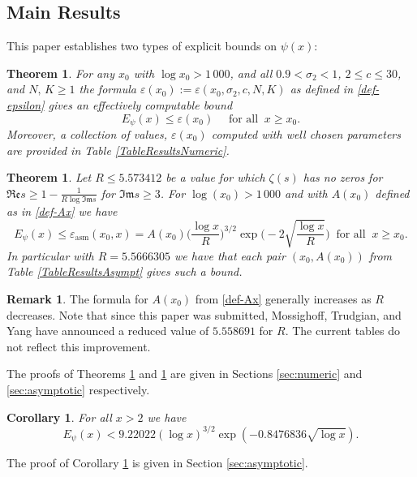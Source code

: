 \documentclass[10pt]{amsart}
\newtheorem{thm}[prop]{Theorem}
\newtheorem{cor}[prop]{Corollary}
\theoremstyle{definition}
\newtheorem{Rem}[prop]{Remark}
\numberwithin{equation}{section}
\begin{document}
\subsection{Main Results}


This paper establishes two types of explicit bounds on $\psi(x)$:

\begin{thm}\label{thm-numericVersion}
For any $x_0$ with $\log x_0>1\,000$,  and all $0.9 < \sigma_2 < 1$, $2 \le  c \le 30$,  and $N,\, K\ge 1$ the formula $\varepsilon(x_0)  := \varepsilon(x_0,\sigma_2,c,N,K)$ as defined in \eqref{def-epsilon} gives an effectively computable bound
\[ E_{\psi}(x)  \le  \varepsilon(x_0) \quad \text{ for all }\ x \ge x_0. \]
Moreover, a collection of values, $\varepsilon(x_0)$ computed with well chosen parameters are provided in  Table \ref{TableResultsNumeric}. 
\end{thm}

\begin{thm}\label{thm-asymptoticVersion}
Let $R \leq  5.573412$ be a value for which $\zeta(s)$ has no zeros for $\mathfrak{Re} s \ge 1-\frac{1}{R\log \mathfrak{Im} s}$ for $\mathfrak{Im} s \ge 3$.
For $\log(x_0) > 1\,000$ and with $A(x_0)$ defined as in \eqref{def-Ax} we have 
\begin{equation}
E_{\psi}(x)  \le   \varepsilon_{\text{asm}}(x_0,x) =  A(x_0) \Big( \frac{\log x}{R}\Big)^{3/2} \exp\Big( -2 \sqrt{\frac{\log x}{R}}\Big) \ \text{ for all }\ x \ge x_0.
\end{equation}
In particular with $R= 5.5666305$ we have that each pair $(x_0,A(x_0))$ from Table  \ref{TableResultsAsympt} gives such a bound.
\end{thm}
\begin{Rem}
The formula for $A(x_0)$ from \eqref{def-Ax} generally increases as $R$ decreases. 
Note that since this paper was submitted, Mossighoff, Trudgian, and Yang \cite{MoTrYa22} have announced a reduced value of $5.558691$ for $R$. The current tables do not reflect this improvement. 
\end{Rem}

\noindent The proofs of Theorems \ref{thm-numericVersion} and \ref{thm-asymptoticVersion} are given in Sections \ref{sec:numeric} and \ref{sec:asymptotic} respectively.

\begin{cor}\label{cor:allx}
For all $x > 2$ we have
\[
E_{\psi}(x)   <  9.22022(\log x)^{3/2}\exp(-0.8476836\sqrt{\log x}). \]
\end{cor}
\noindent The proof of Corollary \ref{cor:allx} is given in Section \ref{sec:asymptotic}.
\end{document}
